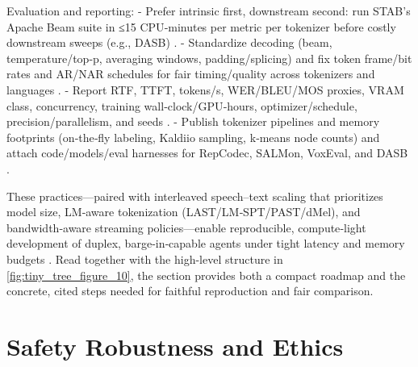 Evaluation and reporting:
- Prefer intrinsic first, downstream second: run STAB’s Apache Beam suite in ≤15 CPU‑minutes per metric per tokenizer before costly downstream sweeps (e.g., DASB) \cite{vashishth2024stabspeechtokenizerassessmentbenchmark,mousavi2024dasbdiscreteaudiospeechbenchmark}.
- Standardize decoding (beam, temperature/top‑p, averaging windows, padding/splicing) and fix token frame/bit rates and AR/NAR schedules for fair timing/quality across tokenizers and languages \cite{vashishth2024stabspeechtokenizerassessmentbenchmark,onda2025benchmarkingprosodyencodingdiscretespeec,entry2025indicsuperbspeechprocessinguniversalperf}.
- Report RTF, TTFT, tokens/s, WER/BLEU/MOS proxies, VRAM class, concurrency, training wall‑clock/GPU‑hours, optimizer/schedule, precision/parallelism, and seeds \cite{maimon2025slammingtrainingspeechlanguagemodelonegp,chen2023reducingbarriersselfsupervisedlearninghu,maimon2025scalinganalysisinterleavedspeechtextlang}.
- Publish tokenizer pipelines and memory footprints (on‑the‑fly labeling, Kaldiio sampling, k‑means node counts) and attach code/models/eval harnesses for RepCodec, SALMon, VoxEval, and DASB \cite{chen2023reducingbarriersselfsupervisedlearninghu,huang2024repcodecspeechrepresentationcodectokeniz,maimon2025salmonsuiteacousticlanguagemodelevaluati,cui2025voxevalbenchmarkingknowledgeunderstandin,mousavi2024dasbdiscreteaudiospeechbenchmark}.

These practices—paired with interleaved speech–text scaling that prioritizes model size, LM‑aware tokenization (LAST/LM‑SPT/PAST/dMel), and bandwidth‑aware streaming policies—enable reproducible, compute‑light development of duplex, barge‑in‑capable agents under tight latency and memory budgets \cite{turetzky2024lastlanguagemodelawarespeechtokenization,jo2025lmsptalignedsemanticdistillationspeechto,har-tuv2025pastphoneticacousticspeechtokenizer,bai2025dmelspeechtokenizationmadesimple,maimon2025scalinganalysisinterleavedspeechtextlang}. Read together with the high-level structure in \autoref{fig:tiny_tree_figure_10}, the section provides both a compact roadmap and the concrete, cited steps needed for faithful reproduction and fair comparison.






\section{Safety Robustness and Ethics} \label{sec:Safety Robustness and Ethics}

